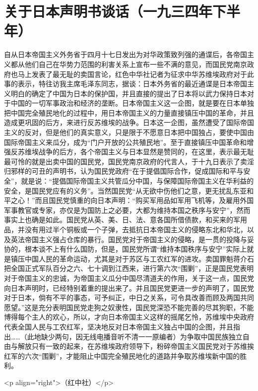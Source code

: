 \section[关于日本声明书谈话（一九三四年下半年）]{关于日本声明书谈话（一九三四年下半年）}


自从日本帝国主义外务省于四月十七日发出为对华政策致列强的通谍后，各帝国主义都从他们自己在华势力范围的利害关系上宣布一些不满的意见，而国民党南京政府也马上发表了最无耻的卖国言论，红色中华社记者为征求中华苏维埃政府对于此事的表示，特往访我主席毛泽东同志，据谈：日本外务省的最近通谍是日本帝国主义明白的确定了中国为日本的保护国，并且直接的提出了日本将以武力保持日本对于中国的一切军事政治和经济的垄断。日本帝国主义这一企图，就是要在日本单独把中国完全殖民地化的过程中，用日本帝国主义的力量直接镇压中国的革命，并且造成更巩固的后方，来进行反苏维埃的战争。日本这一企图，虽然遭受了国际帝国主义的反对，但是他们的真实意义，只是限于不愿意日本把中国独占，要使中国由国际帝国主义来瓜分，成为“门户开放的公共殖民地”。至于直接镇压中国革命和增强反苏维埃战争的后方，各个帝国主义与日本显然是赞同的，在这里，表示最无耻最可怜的就是出卖中国的国民党，国民党南京政府的代言人，于十九日表示了卖淫归邪样的可丑的声明书，认为国民党政府“在于提倡国际合作，促成国际和平与安全”，就是说：“提倡国际帝国主义共管瓜分中国，与保障国际帝国主义在华利益的安全，是国民党应有的义务”。当然国民党“从无欲中伤他们之意，更无扰乱东亚和平之心！”而且国民党慎重的向日本声明：“购买军用品如军用飞机等，及雇用外国军事教官或专家，亦仅是为国防上之必要，大都为维持本国之秩序与安宁”，然而事实上也确是如此。国民党从英、美、日、法、意各国所借债款，和买来的军用品，并没有用过半个铜板或一个子弹，去抵抗日本帝国主义的侵略东北和华北，以及英法帝国主义强占仓库的暴行。国民党对于帝国主义的侵略，是一贯的投降与妥协的，根本谈不上有什么国防，但是，国民党所谓“维持本国秩序与安宁”实际上就是镇压中国人民的革命运动，尤其是对于苏区与工农红军的进攻。卖国罪魁蒋介石把全国正式军队百分之六、七十调到江西来，进行第六次“围剿”，正是国民党表明对于帝国主义的忠诚，为帝国主义瓜分中国尽清道夫的作用，关于这一点，国民党向日本声明时，已经特别着重的提出来了。并且国民党更进一步的声明了，国民党对于日本，倘有不平的事态，可予纠正，中日之关系，可令具改善而顾及两国共同愿望。”这是充分表明国民党走狗之奴隶性，国民党深恐不能完善的尽其狗职，不能博得每个主人的欢心，所以，才向日本帝国主义这样的摇尾乞怜，苏维埃中央政府代表全国人民与工农红军，坚决地反对日本帝国主义独占中国的企图，并且指出……（此地缺少两句，因无线电播音听不清一一原编者）为争取中国民族独立自由与解放只有一致的起来，在苏维埃政府领导下，粉碎帝国主义国民党对于苏维挨红军的六次“围剿”，才能阻止中国完全殖民地化的道路并争取苏维埃新中国的胜利。


<p align="right">（红中社）</p>

